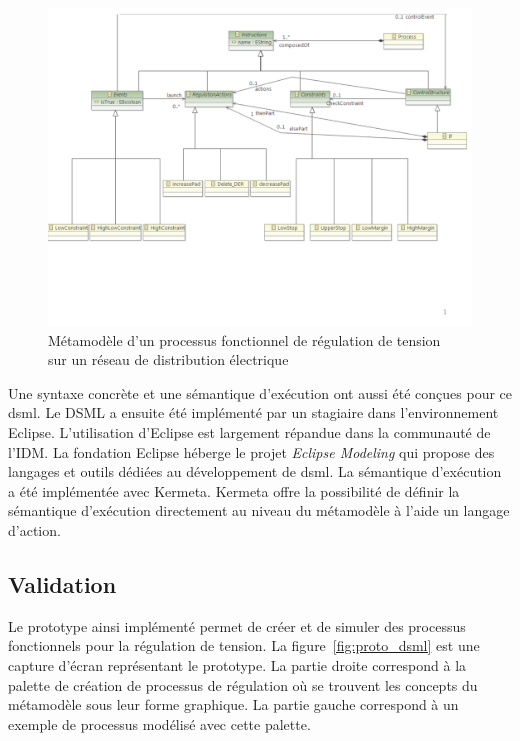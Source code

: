 \begin{figure}[!ht]
  \centering
  \includegraphics[trim = 0cm 5cm 0cm 0cm, clip, width=1\textwidth]{figures/6_methodologie/metamodele_dsml.pdf}
 \caption{Métamodèle d'un processus fonctionnel de régulation de tension \\
          sur un réseau de distribution électrique}
 \label{fig:meta_dsml}
\end{figure} 

Une syntaxe concrète et une sémantique d'exécution ont aussi été conçues pour ce
\gls{dsml}. Le DSML a ensuite été implémenté par un stagiaire dans
l'environnement Eclipse. L'utilisation d'Eclipse est largement répandue dans la
communauté de l'IDM. La fondation Eclipse héberge le projet \textit{Eclipse
Modeling} qui propose des langages et outils dédiées au développement de
\gls{dsml}. La sémantique d'exécution a été implémentée avec Kermeta. Kermeta
offre la possibilité de définir la sémantique d'exécution
directement au niveau du métamodèle à l'aide un langage d'action.


\subsection{Validation}
Le prototype ainsi implémenté permet de
créer et de simuler des processus fonctionnels pour la régulation de tension. La
figure~\ref{fig:proto_dsml} est une capture d'écran représentant le prototype. La
partie droite correspond à la palette de création de processus de régulation où
se trouvent les concepts du métamodèle sous leur forme graphique. La partie
gauche correspond à un exemple de processus modélisé avec cette palette.

